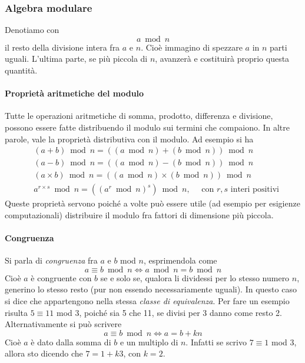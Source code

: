 \documentclass{article}
\theoremstyle{definition}
\begin{document}
\subsubsection{Algebra modulare}
Denotiamo con
\begin{equation*}
    a \bmod n
\end{equation*}
il resto della divisione intera fra $a$ e $n$. Cioè immagino di spezzare $a$ in $n$ parti uguali. L'ultima parte, se più piccola di $n$, avanzerà e costituirà proprio questa quantità.

\paragraph{Proprietà aritmetiche del modulo}
Tutte le operazioni aritmetiche di somma, prodotto, differenza e divisione, possono essere fatte distribuendo il modulo sui termini che compaiono. In altre parole, vale la proprietà distributiva con il modulo.
Ad esempio si ha
\begin{align*}
    &(a + b) \bmod n = ((a \bmod n) + (b \bmod n)) \bmod n \\ 
    &(a - b) \bmod n = ((a \bmod n) - (b \bmod n)) \bmod n \\
    &(a \times b) \bmod n = ((a \bmod n) \times (b \bmod n)) \bmod n \\
    &a^{r \times s} \bmod n = ((a^r \bmod n)^s) \bmod n, \quad \text{ con } r,s \text{ interi positivi} 
\end{align*}
Queste proprietà servono poiché a volte può essere utile (ad esempio per esigienze computazionali) distribuire il modulo fra fattori di dimensione più piccola.

\paragraph{Congruenza}
Si parla di \emph{congruenza} fra $a$ e $b$ mod $n$, esprimendola come
\begin{equation*}
    a \equiv b \bmod n \Leftrightarrow a \bmod n = b \bmod n
\end{equation*}
Cioè $a$ è congruente con $b$ se e solo se, qualora li dividessi per lo stesso numero $n$, generino lo stesso resto (pur non essendo necessariamente uguali). In questo caso si dice che appartengono nella stessa \emph{classe di equivalenza}.
Per fare un esempio risulta $5 \equiv 11$ mod $3$, poiché sia 5 che 11, se divisi per 3 danno come resto 2.
Alternativamente si può scrivere 
\begin{equation*}
    a \equiv b \bmod n \Leftrightarrow a = b + kn
\end{equation*}
Cioè $a$ è dato dalla somma di $b$ e un multiplo di $n$. Infatti se scrivo $7 \equiv 1$ mod $3$, allora sto dicendo che $7 = 1 + k3$, con $k = 2$.
\end{document}
